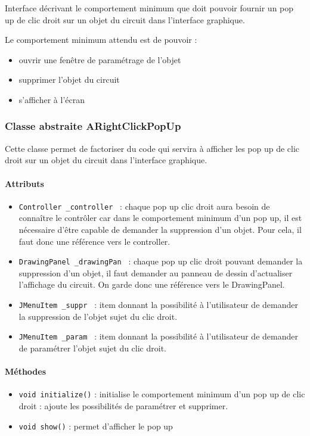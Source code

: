\documentclass{report}
\begin{document}
Interface décrivant le comportement minimum que doit pouvoir fournir un pop up de clic droit sur un objet du circuit dans l'interface graphique.

Le comportement minimum attendu est de pouvoir :
\begin{itemize}
\item ouvrir une fenêtre de paramétrage de l'objet
\item supprimer l'objet du circuit
\item s'afficher à l'écran
\end{itemize}

\subsubsection{Classe abstraite ARightClickPopUp}

Cette classe permet de factoriser du code qui servira à afficher les pop up de clic droit sur un objet du circuit dans l'interface graphique.

\paragraph*{Attributs}
\begin{itemize}
\item \texttt{Controller \_controller } : chaque pop up clic droit aura besoin de connaître le contrôler car dans le comportement minimum d'un pop up, il est nécessaire d'être capable de demander la suppression d'un objet. Pour cela, il faut donc une référence vers le controller.
\item \texttt{DrawingPanel \_drawingPan } : chaque pop up clic droit pouvant demander la suppression d'un objet, il faut demander au panneau de dessin d'actualiser l'affichage du circuit. On garde donc une référence vers le DrawingPanel.
\item \texttt{JMenuItem \_suppr } : item donnant la possibilité à l'utilisateur de demander la suppression de l'objet sujet du clic droit.
\item \texttt{JMenuItem \_param } : item donnant la possibilité à l'utilisateur de demander de paramétrer l'objet sujet du clic droit.
\end{itemize}

\paragraph*{Méthodes}
\begin{itemize}
\item \texttt{void initialize()} : initialise le comportement minimum d'un pop up de clic droit : ajoute les possibilités de paramétrer et supprimer.
\item \texttt{void show()} : permet d'afficher le pop up
\end{itemize}
\end{document}
